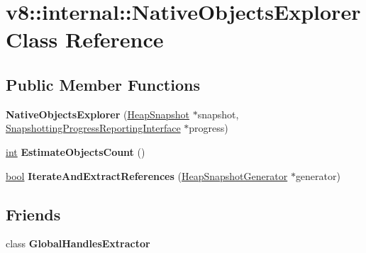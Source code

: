 \hypertarget{classv8_1_1internal_1_1NativeObjectsExplorer}{}\section{v8\+:\+:internal\+:\+:Native\+Objects\+Explorer Class Reference}
\label{classv8_1_1internal_1_1NativeObjectsExplorer}
\subsection*{Public Member Functions}
\begin{DoxyCompactItemize}
\item 
\mbox{\label{classv8_1_1internal_1_1NativeObjectsExplorer_a9772f761664e9cd0b73dca9bf9d21ad2}} 
{\bfseries Native\+Objects\+Explorer} (\mbox{\hyperlink{classv8_1_1internal_1_1HeapSnapshot}{Heap\+Snapshot}} $\ast$snapshot, \mbox{\hyperlink{classv8_1_1internal_1_1SnapshottingProgressReportingInterface}{Snapshotting\+Progress\+Reporting\+Interface}} $\ast$progress)
\item 
\mbox{\label{classv8_1_1internal_1_1NativeObjectsExplorer_a56adf5cff392cc3b6e569daf5d401647}} 
\mbox{\hyperlink{classint}{int}} {\bfseries Estimate\+Objects\+Count} ()
\item 
\mbox{\label{classv8_1_1internal_1_1NativeObjectsExplorer_a9300a777a1ff0b2abb418dc7c3882a22}} 
\mbox{\hyperlink{classbool}{bool}} {\bfseries Iterate\+And\+Extract\+References} (\mbox{\hyperlink{classv8_1_1internal_1_1HeapSnapshotGenerator}{Heap\+Snapshot\+Generator}} $\ast$generator)
\end{DoxyCompactItemize}
\subsection*{Friends}
\begin{DoxyCompactItemize}
\item 
\mbox{\label{classv8_1_1internal_1_1NativeObjectsExplorer_afbfc33c11a680509accaad1e0797b32b}} 
class {\bfseries Global\+Handles\+Extractor}
\end{DoxyCompactItemize}



